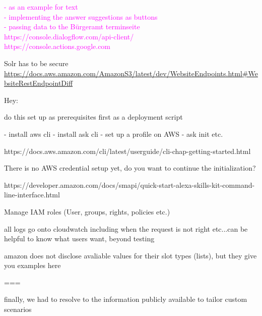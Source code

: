 \textcolor{magenta}{
- as an example for text\\
- implementing the answer suggestions as buttons\\
- passing data to the Bürgeramt terminseite\\
https://console.dialogflow.com/api-client/ \\
https://console.actions.google.com
}


Solr has to be secure
\url{https://docs.aws.amazon.com/AmazonS3/latest/dev/WebsiteEndpoints.html#WebsiteRestEndpointDiff}


Hey:

do this set up as prerequisites first
as a deployment script

- install aws cli
- install ask cli
- set up a profile on AWS
- ask init etc.

https://docs.aws.amazon.com/cli/latest/userguide/cli-chap-getting-started.html

There is no AWS credential setup yet, do you want to continue the initialization?

https://developer.amazon.com/docs/smapi/quick-start-alexa-skills-kit-command-line-interface.html



























Manage IAM roles (User, groups, rights, policies etc.)


all logs go onto cloudwatch
including when the request is not right etc...can be helpful to know what users want, beyond testing





amazon does not disclose avaliable values for their slot types (lists), but they give you examples here


===

finally, we had to resolve to the information publicly available to tailor custom scenarios



